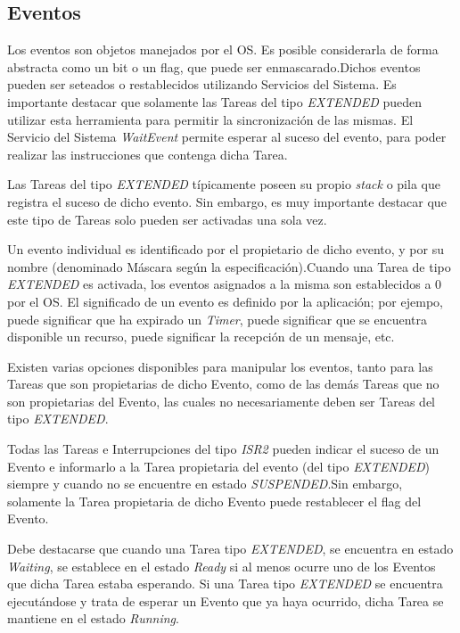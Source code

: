 \documentclass[12pt,letterpaper]{article}
\begin{document}
\subsection{Eventos}

Los eventos son objetos manejados por el OS. Es posible considerarla de forma abstracta como un bit o un flag, que puede ser enmascarado.Dichos eventos pueden ser seteados o restablecidos utilizando Servicios del Sistema. Es importante destacar que solamente las Tareas del tipo \textit{EXTENDED} pueden utilizar esta herramienta para permitir la sincronización de las mismas. El Servicio del Sistema \textit{WaitEvent} permite esperar al suceso del evento, para poder realizar las instrucciones que contenga dicha Tarea.

Las Tareas del tipo \textit{EXTENDED} típicamente poseen su propio \textit{stack} o pila que registra el suceso de dicho evento. Sin embargo, es muy importante destacar que este tipo de Tareas solo pueden ser activadas una sola vez.

Un evento individual es identificado por el propietario de dicho evento, y por su nombre (denominado Máscara según la especificación).Cuando una Tarea de tipo \textit{EXTENDED} es activada, los eventos asignados a la misma son establecidos a 0 por el OS. El significado de un evento es definido por la aplicación; por ejempo, puede significar que ha expirado un \textit{Timer}, puede significar que se encuentra disponible un recurso, puede significar la recepción de un mensaje, etc.

Existen varias opciones disponibles para manipular los eventos, tanto para las Tareas que son propietarias de dicho Evento, como de las demás Tareas que no son propietarias del Evento, las cuales no necesariamente deben ser Tareas del tipo \textit{EXTENDED}.

Todas las Tareas e Interrupciones del tipo \textit{ISR2} pueden indicar el suceso de un Evento e informarlo a la Tarea propietaria del evento (del tipo \textit{EXTENDED}) siempre y cuando no se encuentre en estado \textit{SUSPENDED}.Sin embargo, solamente la Tarea propietaria de dicho Evento puede restablecer el flag del Evento.

Debe destacarse que cuando una Tarea tipo \textit{EXTENDED}, se encuentra en estado \textit{Waiting}, se establece en el estado \textit{Ready} si al menos ocurre uno de los Eventos que dicha Tarea estaba esperando. Si una Tarea tipo \textit{EXTENDED} se encuentra ejecutándose y trata de esperar un Evento que ya haya ocurrido, dicha Tarea se mantiene en el estado \textit{Running}.
\end{document}
